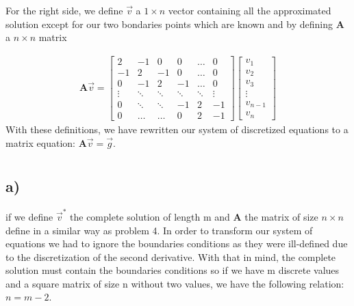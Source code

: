 \documentclass[a4paper,10pt,english]{article}
\begin{document}
For the right side, we define $\vec{v}$ a $1 \times n$ vector containing all
the approximated solution except for our two bondaries points which are known
and by defining $\mathbf{A}$ a $n \times n$ matrix

\begin{align}
\mathbf{A}\vec{v} = \begin{bmatrix}
                 2 & -1 & 0 & 0 & \dots & 0 \\
                 -1 & 2 & -1& 0 & \dots & 0\\
                 0 & -1 & 2 & -1 & \dots & 0\\
                 \vdots & \ddots &  \ddots & \ddots & \ddots & \vdots \\
                 0 & \ddots &  \ddots & -1 & 2 & -1 \\
                 0 & \dots &  \dots & 0 & 2 & -1
                 \end{bmatrix}
                 \begin{bmatrix}
                     v_1 \\
                     v_2 \\
                     v_3 \\
                     \vdots \\
                     v_{n - 1} \\
                     v_{n}
                 \end{bmatrix}
\end{align}
With these definitions, we have rewritten our system of discretized equations to
a matrix equation: $\mathbf{A}\vec{v} = \vec{g}$.




\section{} %

\subsection{a)}
if we define $\vec{v}^{*}$ the complete solution of length m and
$\mathbf{A}$ the matrix of size $n\times n $ define in a similar way as problem
4. In order to transform our system of equations we had to ignore the boundaries
conditions as they were ill-defined due to the discretization of the second
derivative. With that in mind, the complete solution must contain the boundaries
conditions so if we have m discrete values and a square matrix of size n without
two values, we have the following relation: $n = m-2$.
\end{document}
